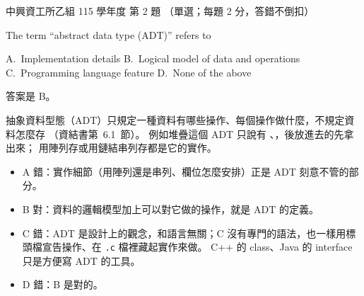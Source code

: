 \begin{pastexam}[label={px:nchu-115-is-02}]{中興資工所乙組 115 學年度 第 2 題}
（單選；每題 2 分，答錯不倒扣）

The term ``abstract data type (ADT)'' refers to

A.~Implementation details \qquad B.~Logical model of data and operations\\
C.~Programming language feature \qquad D.~None of the above
\end{pastexam}

\begin{pastsoln}
答案是 B。

抽象資料型態（ADT）只規定一種資料有哪些操作、每個操作做什麼，不規定資料怎麼存
（資結書第~6.1~節）。 例如堆疊這個 ADT 只說有 、，後放進去的先拿出來；
用陣列存或用鏈結串列存都是它的實作。
\begin{itemize}
\item A 錯：實作細節（用陣列還是串列、欄位怎麼安排）正是 ADT 刻意不管的部分。
\item B 對：資料的邏輯模型加上可以對它做的操作，就是 ADT 的定義。
\item C 錯：ADT 是設計上的觀念，和語言無關；C 沒有專門的語法，也一樣用標頭檔宣告操作、在
\texttt{.c} 檔裡藏起實作來做。 C++ 的 class、Java 的 interface 只是方便寫 ADT 的工具。
\item D 錯：B 是對的。
\end{itemize}
\end{pastsoln}
